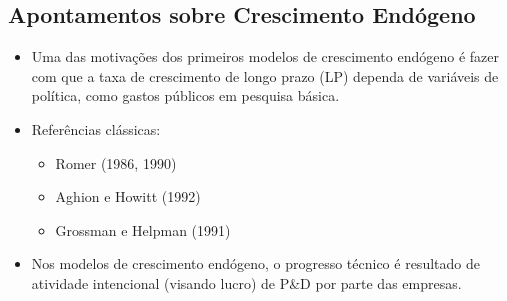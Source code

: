 \documentclass[a4paper,12pt]{article}[abntex2]
\begin{document}
\subsection{\textbf{Apontamentos sobre Crescimento Endógeno}}
\begin{itemize}
    \item Uma das motivações dos primeiros modelos de crescimento endógeno 
    é fazer com que a taxa de crescimento de longo prazo (LP) 
    dependa de variáveis de política, como gastos públicos em pesquisa básica.

    \item Referências clássicas:
    \begin{itemize}
        \item Romer (1986, 1990)
        \item Aghion e Howitt (1992)
        \item Grossman e Helpman (1991)
    \end{itemize}

    \item Nos modelos de crescimento endógeno, o progresso técnico é resultado 
    de atividade intencional (visando lucro) de P\&D por parte das empresas.
\end{itemize}
\end{document}

